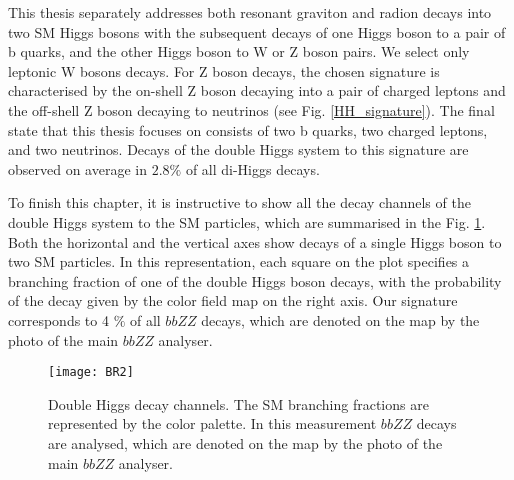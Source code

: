 This thesis separately addresses both resonant graviton and radion decays into two SM Higgs bosons with the subsequent decays of one Higgs boson to a pair of b quarks, and the other Higgs boson to W or Z boson pairs. We select only leptonic W bosons decays. For Z boson decays, the chosen signature is characterised by the on-shell Z boson decaying into a pair of charged leptons and the off-shell Z boson decaying to neutrinos (see Fig. \ref{HH_signature}). The final state that this thesis focuses on consists of two b quarks, two charged leptons, and two neutrinos. Decays of the double Higgs system to this signature are observed on average in $2.8 \%$ of all di-Higgs decays. 


To finish this chapter, it is instructive to show all the decay channels of the double Higgs system to the SM particles, which are summarised in the Fig. \ref{BR}. Both the horizontal and the vertical axes show decays of a single Higgs boson to two SM particles. In this representation, each square on the plot specifies a branching fraction of one of the double Higgs boson decays, with the probability of the decay given by the color field map on the right axis. Our signature corresponds to 4 $\%$ of all $bbZZ$ decays, which are denoted on the map by the photo of the main $bbZZ$ analyser. 

\begin{figure}[H]
  \centering
    \texttt{[image: BR2]}
    \caption[Double Higgs decay channels]{Double Higgs decay channels. The SM branching fractions are represented by the color palette. In this measurement $bbZZ$ decays are analysed, which are denoted on the map by the photo of the main $bbZZ$ analyser.}
    \label{BR}
\end{figure}



